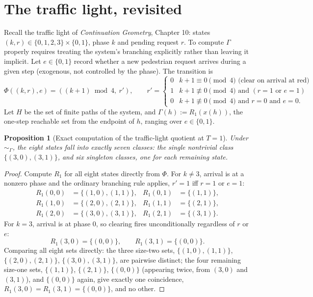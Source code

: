 \documentclass[11pt]{report}
\newtheorem{proposition}{Proposition}[chapter]
\begin{document}
\section*{The traffic light, revisited}

Recall the traffic light of \emph{Continuation Geometry}, Chapter 10:
states $(k, r) \in \{0,1,2,3\} \times \{0,1\}$, phase $k$ and pending
request $r$. To compute $\Gamma$ properly requires treating the
system's branching explicitly rather than leaving it implicit. Let
$e \in \{0,1\}$ record whether a new pedestrian request arrives during
a given step (exogenous, not controlled by the phase). The transition
is
\[
\Phi((k,r), e) = \left( (k+1) \bmod 4,\ r' \right), \qquad
r' = \begin{cases}
0 & k+1 \equiv 0 \pmod 4 \text{ (clear on arrival at red)} \\
1 & k+1 \not\equiv 0 \pmod 4 \text{ and } (r = 1 \text{ or } e = 1) \\
0 & k+1 \not\equiv 0 \pmod 4 \text{ and } r = 0 \text{ and } e = 0.
\end{cases}
\]
Let $H$ be the set of finite paths of the system, and
$\Gamma(h) := R_1(x(h))$, the one-step reachable set from the
endpoint of $h$, ranging over $e \in \{0,1\}$.

\begin{proposition}[Exact computation of the traffic-light quotient at $T=1$]
\label{prop:tlquotient}
Under $\sim_\Gamma$, the eight states fall into exactly seven classes:
the single nontrivial class $\{(3,0),(3,1)\}$, and six singleton
classes, one for each remaining state.
\end{proposition}
\begin{proof}
Compute $R_1$ for all eight states directly from $\Phi$. For
$k \neq 3$, arrival is at a nonzero phase and the ordinary branching
rule applies, $r' = 1$ iff $r=1$ or $e=1$:
\begin{align*}
R_1(0,0) &= \{(1,0),(1,1)\}, & R_1(0,1) &= \{(1,1)\}, \\
R_1(1,0) &= \{(2,0),(2,1)\}, & R_1(1,1) &= \{(2,1)\}, \\
R_1(2,0) &= \{(3,0),(3,1)\}, & R_1(2,1) &= \{(3,1)\}.
\end{align*}
For $k=3$, arrival is at phase $0$, so clearing fires unconditionally
regardless of $r$ or $e$:
\[
R_1(3,0) = \{(0,0)\}, \qquad R_1(3,1) = \{(0,0)\}.
\]
Comparing all eight sets directly: the three size-two sets,
$\{(1,0),(1,1)\}$, $\{(2,0),(2,1)\}$, $\{(3,0),(3,1)\}$, are pairwise
distinct; the four remaining size-one sets, $\{(1,1)\}$, $\{(2,1)\}$,
$\{(0,0)\}$ (appearing twice, from $(3,0)$ and $(3,1)$), and
$\{(0,0)\}$ again, give exactly one coincidence, $R_1(3,0) = R_1(3,1)
= \{(0,0)\}$, and no other.
\end{proof}
\end{document}
